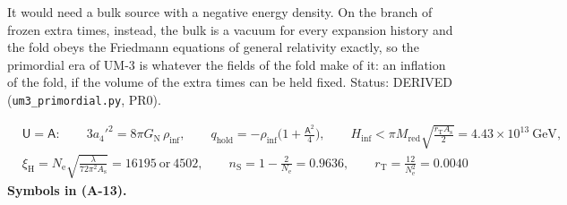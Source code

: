 \documentclass[
  10pt,
]{article}
\begin{document}
It would need a bulk source with a negative energy density. On the
branch of frozen extra times, instead, the bulk is a vacuum for every
expansion history and the fold obeys the Friedmann equations of general
relativity exactly, so the primordial era of UM-3 is whatever the fields
of the fold make of it: an inflation of the fold, if the volume of the
extra times can be held fixed. Status: DERIVED
(\texttt{um3\_primordial.py}, PR0).

\[
\begin{aligned}
&\mathsf{U} = \mathsf{A}:\qquad 3a_4'^2 = 8\pi G_{\mathrm{N}}\,\rho_{\mathrm{inf}},\qquad q_{\mathrm{hold}} = -\rho_{\mathrm{inf}}\Big(1 + \frac{\mathsf{A}^2}{4}\Big),\qquad
 H_{\mathrm{inf}} < \pi M_{\mathrm{red}}\sqrt{\frac{r_{\mathrm{T}}A_{\mathrm{s}}}{2}} = 4.43\times10^{13}\ \text{GeV},\\
&\xi_{\mathrm{H}} = N_{\mathrm{e}}\sqrt{\frac{\lambda}{72\pi^2A_{\mathrm{s}}}} = 16195\ \text{or}\ 4502,\qquad
 n_{\mathrm{S}} = 1 - \frac{2}{N_{\mathrm{e}}} = 0.9636,\qquad r_{\mathrm{T}} = \frac{12}{N_{\mathrm{e}}^2} = 0.0040
\end{aligned} \tag{A-13}
\] \textbf{Symbols in (A-13).}
\end{document}

